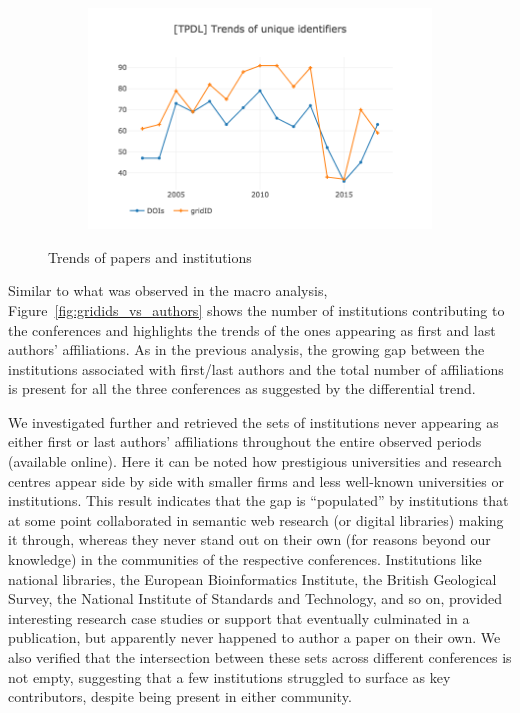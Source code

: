\documentclass{llncs}
\begin{document}
\begin{figure}[t]
\begin{subfigure}{.5\textwidth}
	\includegraphics[width=\textwidth]{images/tpdl_identifiers.png}
	\caption[ ]{}
	\label{fig:tpdl_identifiers}
\end{subfigure}
\caption{Trends of papers and institutions}
\label{fig:identifiers}
\end{figure}

Similar to what was observed in the macro analysis, Figure~\ref{fig:gridids_vs_authors} shows the number of institutions contributing to the conferences and highlights the trends of the ones appearing as first and last authors' affiliations. 
As in the previous analysis, the growing gap between the institutions associated with first/last authors and the total number of affiliations is present for all the three conferences as suggested by the differential trend.

We investigated further and retrieved the sets of institutions never appearing as either first or last authors' affiliations throughout the entire observed periods (available online). 
Here it can be noted how prestigious universities and research centres appear side by side with smaller firms and less well-known universities or institutions.
This result indicates that the gap is ``populated'' by institutions that at some point collaborated in semantic web research (or digital libraries) making it through, whereas they never stand out on their own (for reasons beyond our knowledge) in the communities of the respective conferences.
Institutions like national libraries, the European Bioinformatics Institute, the British Geological Survey, the National Institute of Standards and Technology, and so on, provided interesting research case studies or support that eventually culminated in a publication, but apparently never happened to author a paper on their own.
We also verified that the intersection between these sets across different conferences is not empty, suggesting that a few institutions struggled to surface as key contributors, despite being present in either community.
\end{document}
